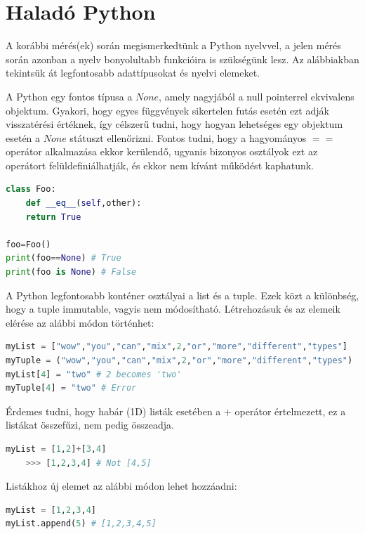 \documentclass[12pt,a4paper,oneside]{report}             %
\begin{document}
\section{Haladó Python}

A korábbi mérés(ek) során megismerkedtünk a Python nyelvvel, a jelen mérés során azonban a nyelv bonyolultabb funkcióira is szükségünk lesz. Az alábbiakban tekintsük át legfontosabb adattípusokat és nyelvi elemeket.

A Python egy fontos típusa a $None$, amely nagyjából a null pointerrel ekvivalens objektum. Gyakori, hogy egyes függvények sikertelen futás esetén ezt adják visszatérési értéknek, így célszerű tudni, hogy hogyan lehetséges egy objektum esetén a $None$ státuszt ellenőrizni. Fontos tudni, hogy a hagyományos $==$ operátor alkalmazása ekkor kerülendő, ugyanis bizonyos osztályok ezt az operátort felüldefiniálhatják, és ekkor nem kívánt működést kaphatunk.

\begin{lstlisting}[language=Python]
class Foo:
	def __eq__(self,other):
	return True
	
foo=Foo()
print(foo==None) # True
print(foo is None) # False
\end{lstlisting}

A Python legfontosabb konténer osztályai a list és a tuple. Ezek közt a különbség, hogy a tuple immutable, vagyis nem módosítható. Létrehozásuk és az elemeik elérése az alábbi módon történhet:

\begin{lstlisting}[language=Python]
myList = ["wow","you","can","mix",2,"or","more","different","types"]
myTuple = ("wow","you","can","mix",2,"or","more","different","types")
myList[4] = "two" # 2 becomes 'two'
myTuple[4] = "two" # Error
\end{lstlisting}

Érdemes tudni, hogy habár (1D) listák esetében a $+$ operátor értelmezett, ez a listákat összefűzi, nem pedig összeadja.

\begin{lstlisting}[language=Python]
myList = [1,2]+[3,4]
	>>> [1,2,3,4] # Not [4,5]
\end{lstlisting}

Listákhoz új elemet az alábbi módon lehet hozzáadni:

\begin{lstlisting}[language=Python]
myList = [1,2,3,4]
myList.append(5) # [1,2,3,4,5]
\end{lstlisting}
\end{document}
